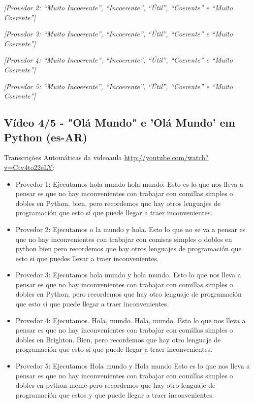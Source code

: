 \noindent
\textit{[Provedor 2: ``Muito Incoerente'', ``Incoerente'', ``Útil'', ``Coerente'' e ``Muito Coerente'']}

\noindent
\textit{[Provedor 3: ``Muito Incoerente'', ``Incoerente'', ``Útil'', ``Coerente'' e ``Muito Coerente'']}

\noindent
\textit{[Provedor 4: ``Muito Incoerente'', ``Incoerente'', ``Útil'', ``Coerente'' e ``Muito Coerente'']}

\noindent
\textit{[Provedor 5: ``Muito Incoerente'', ``Incoerente'', ``Útil'', ``Coerente'' e ``Muito Coerente'']}

\subsection{Vídeo 4/5 - "Olá Mundo" e 'Olá Mundo' em Python (es-AR)}

\noindent
Transcrições Automáticas da videoaula \url{http://youtube.com/watch?v=Ctv4to22eLY}:

\begin{itemize}
    \item Provedor 1: Ejecutamos hola mundo hola mundo. Esto es lo que nos lleva a pensar es que no hay inconvenientes con trabajar con comillas simples o dobles en Python, bien, pero recordemos que hay otros lenguajes de programación que esto sí que puede llegar a traer inconvenientes.
    \item Provedor 2: Ejecutamos o la mundo y hola. Esto lo que no se va a pensar es que no hay inconvenientes con trabajar con comisas simples o dobles en python bien pero recordemos que hay otros lenguajes de programación que esto si que puedes llevar a traer inconvenientes.
    \item Provedor 3: Ejecutamos hola mundo y hola mundo. Esto lo que nos lleva a pensar es que no hay inconvenientes con trabajar con comillas simples o dobles en Python, pero recordemos que hay otro lenguaje de programación que esto sí que puede llegar a traer inconvenientes.
    \item Provedor 4: Ejecutamos. Hola, mundo. Hola, mundo. Esto lo que nos lleva a pensar es que no hay inconvenientes con trabajar con comillas simples o dobles en Brighton. Bien, pero recordemos que hay otro lenguaje de programación que esto sí que puede llegar a traer inconvenientes.
    \item Provedor 5: Ejecutamos Hola mundo y Hola mundo Esto es lo que nos lleva a pensar es que no hay inconvenientes con trabajar con comillas simples o dobles en python meme pero recordemos que hay otro lenguaje de programación que estos y que puede llegar a traer inconvenientes.
\end{itemize}

